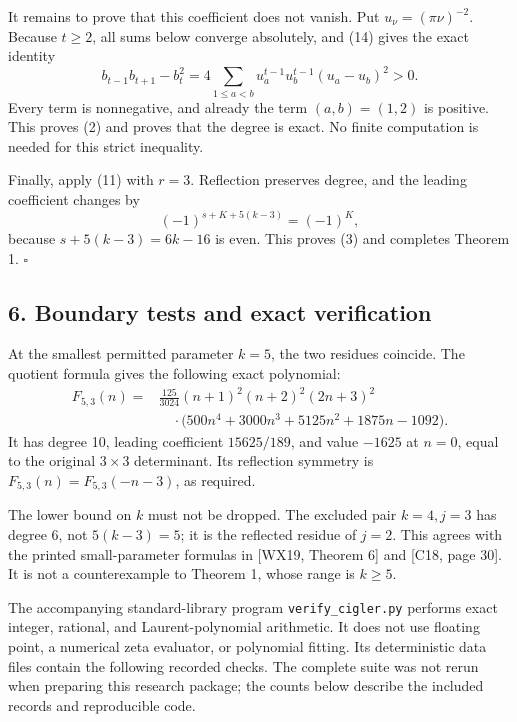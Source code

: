 \documentclass[
  11pt,
]{article}
\begin{document}
It remains to prove that this coefficient does not vanish. Put
\(u_\nu=(\pi\nu)^{-2}\). Because \(t\ge2\), all sums below converge
absolutely, and (14) gives the exact identity \[
 b_{t-1}b_{t+1}-b_t^2
 =4\sum_{1\le a<b}u_a^{t-1}u_b^{t-1}(u_a-u_b)^2>0.
 \tag{17}
\] Every term is nonnegative, and already the term \((a,b)=(1,2)\) is
positive. This proves (2) and proves that the degree is exact. No finite
computation is needed for this strict inequality.

Finally, apply (11) with \(r=3\). Reflection preserves degree, and the
leading coefficient changes by \[
 (-1)^{s+K+5(k-3)}=(-1)^K,
\] because \(s+5(k-3)=6k-16\) is even. This proves (3) and completes
Theorem 1. \(\square\)

\subsection{6. Boundary tests and exact
verification}\label{boundary-tests-and-exact-verification}

At the smallest permitted parameter \(k=5\), the two residues coincide.
The quotient formula gives the following exact polynomial: \[
 \begin{split}
 F_{5,3}(n)={}&\frac{125}{3024}(n+1)^2(n+2)^2(2n+3)^2\\
 &\quad\cdot\bigl(500n^4+3000n^3+5125n^2+1875n-1092\bigr).
 \end{split}
 \tag{18}
\] It has degree 10, leading coefficient \(15625/189\), and value
\(-1625\) at \(n=0\), equal to the original \(3\times3\) determinant.
Its reflection symmetry is \(F_{5,3}(n)=F_{5,3}(-n-3)\), as required.

The lower bound on \(k\) must not be dropped. The excluded pair
\(k=4,j=3\) has degree 6, not \(5(k-3)=5\); it is the reflected residue
of \(j=2\). This agrees with the printed small-parameter formulas in
{[}WX19, Theorem 6{]} and {[}C18, page 30{]}. It is not a counterexample
to Theorem 1, whose range is \(k\ge5\).

The accompanying standard-library program \texttt{verify\_cigler.py} performs
exact integer, rational, and Laurent-polynomial arithmetic. It does not
use floating point, a numerical zeta evaluator, or polynomial fitting.
Its deterministic data files contain the following recorded checks.
The complete suite was not rerun when preparing this research package;
the counts below describe the included records and reproducible code.
\end{document}
